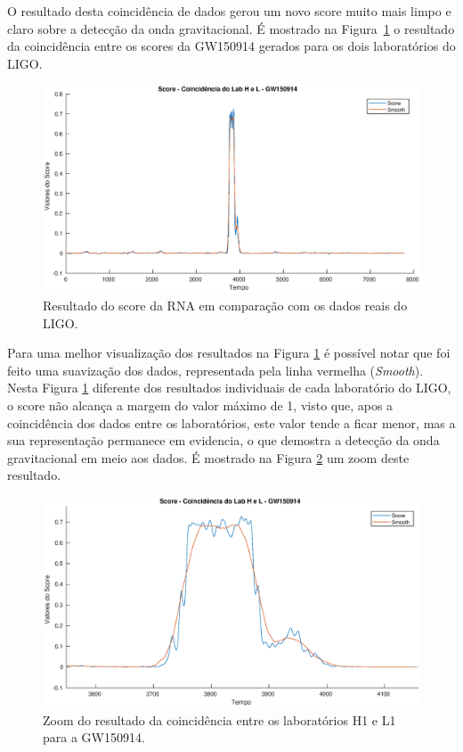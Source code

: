 O resultado desta coincidência de dados gerou um novo score muito mais limpo e claro sobre a detecção da onda gravitacional. É mostrado na Figura~\ref{fig:scoreHL} o resultado da coincidência entre os scores da GW150914 gerados para os dois laboratórios do LIGO.

\begin{figure}[H]
\centering
\includegraphics[width=1\textwidth]{figuras/GW150914_LabHL.eps}
\caption{Resultado do score da RNA em comparação com os dados reais do LIGO.}
\label{fig:scoreHL}
\end{figure}

Para uma melhor visualização dos resultados na Figura \ref{fig:scoreHL} é possível notar que foi feito uma suavização dos dados, representada pela linha vermelha (\textit{Smooth}). Nesta Figura \ref{fig:scoreHL} diferente dos resultados individuais de cada laboratório do LIGO, o score não alcança a margem do valor máximo de 1, visto que, apos a coincidência dos dados entre os laboratórios, este valor tende a ficar menor, mas a sua representação permanece em evidencia, o que demostra a detecção da onda gravitacional em meio aos dados. É mostrado na Figura \ref{fig:scoreHLZoom} um zoom deste resultado.

\begin{figure}[H]
\centering
\includegraphics[width=1\textwidth]{figuras/GW150914_LabHL_zoom.eps}
\caption{Zoom do resultado da coincidência entre os laboratórios H1 e L1 para a GW150914.}
\label{fig:scoreHLZoom}
\end{figure}

